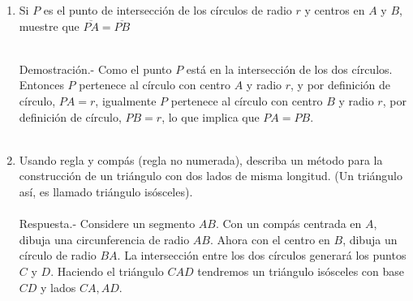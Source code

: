 \documentclass[10pt]{article}
\begin{document}
\begin{enumerate}
	\item Si $P$ es el punto de intersección de los círculos de radio $r$ y centros en $A$ y $B$, muestre que $\overline{PA}=\overline{PB}$\\\\
	\begin{center}
	\end{center}
	Demostración.-\; Como el punto $P$ está en la intersección de los dos círculos. Entonces $P$ pertenece al círculo con centro $A$ y radio $r$, y por definición de círculo, $PA = r$, igualmente $P$ pertenece al círculo con centro $B$ y radio $r$, por definición de círculo, $PB = r$, lo que implica que $PA = PB$.\\\\

	\item Usando regla y compás (regla no numerada), describa un método para la construcción de un triángulo con dos lados de misma longitud. (Un triángulo así, es llamado triángulo isósceles).\\\\
	Respuesta.-\; Considere un segmento $AB$. Con un compás centrada en $A$, dibuja una circunferencia de radio $AB$. Ahora con el centro en $B$, dibuja un círculo de radio $BA$. La intersección entre los dos círculos generará los puntos $C$ y $D$. Haciendo el triángulo $CAD$ tendremos un triángulo isósceles con base $CD$ y lados $CA,AD$.
	\begin{center}
	\end{center}


\end{enumerate}
\end{document}

